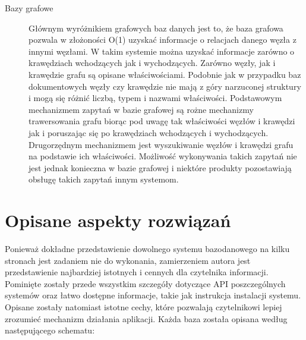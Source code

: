 \begin{description}
 \item[Bazy grafowe]
 Głównym wyróżnikiem grafowych baz danych jest to, że baza grafowa pozwala w złożoności O(1) uzyskać informacje o relacjach danego węzła z innymi węzłami.
 W takim systemie można uzyskać informacje zarówno o krawędziach wchodzących jak i wychodzących.
 Zarówno węzły, jak i krawędzie grafu są opisane właściwościami.
 Podobnie jak w przypadku baz dokumentowych węzły czy krawędzie nie mają z góry narzuconej struktury i mogą się różnić liczbą, typem i nazwami właściwości.
 Podstawowym mechanizmem zapytań w bazie grafowej są rożne mechanizmy trawersowania grafu biorąc pod uwagę tak właściwości węzłów i krawędzi jak i poruszając się po krawędziach wchodzących i wychodzących.
 Drugorzędnym mechanizmem jest wyszukiwanie węzłów i krawędzi grafu na podstawie ich właściwości.
 Możliwość wykonywania takich zapytań nie jest jednak konieczna w bazie grafowej i niektóre produkty pozostawiają obsługę takich zapytań innym systemom. 

\end{description}

\section{Opisane aspekty rozwiązań}

Ponieważ dokładne przedstawienie dowolnego systemu bazodanowego na kilku stronach jest zadaniem nie do wykonania, zamierzeniem autora jest przedstawienie najbardziej istotnych i cennych dla czytelnika informacji.
Pominięte zostały przede wszystkim szczegóły dotyczące API poszczególnych systemów oraz łatwo dostępne informacje, takie jak instrukcja instalacji systemu.
Opisane zostały natomiast istotne cechy, które pozwalają czytelnikowi lepiej zrozumieć mechanizm działania aplikacji.
Każda baza została opisana według następującego schematu:

